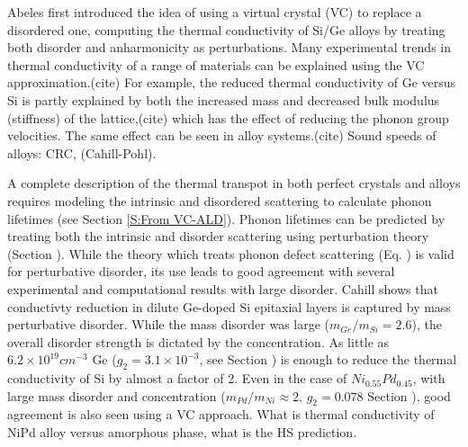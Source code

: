 \documentclass[aps,prb,onecolumn,preprint,superscriptaddress,amsmath,amssymb,floatfix]{revtex4}
\begin{document}
Abeles first introduced the idea of using a virtual crystal (VC) to 
replace a disordered one, computing the
thermal conductivity of Si/Ge alloys by treating both
disorder and anharmonicity as perturbations.\cite{abeles_lattice_1963} 
Many experimental trends in thermal conductivity 
of a range of materials 
can be explained using the VC approximation.(cite) For example,
the reduced thermal conductivity of Ge versus Si is partly explained 
by both the increased mass and decreased bulk modulus (stiffness) of the 
lattice,(cite) which has the effect of reducing the phonon group 
velocities. The same effect can be seen in alloy systems.(cite)
Sound speeds of alloys: CRC, (Cahill-Pohl).

A complete 
description of the thermal transpot in both perfect crystals and alloys 
requires modeling the intrinsic 
and disordered scattering to calculate phonon lifetimes 
(see Section \ref{S:From VC-ALD}).
Phonon lifetimes can be predicted by treating both the intrinsic 
and disorder scattering using perturbation theory (Section ). 
While the theory which treats phonon defect scattering (Eq. ) 
is valid for
perturbative disorder, its use leads to good agreement with
several experimental and computational results with large disorder.  
Cahill shows that conductivty reduction in dilute 
Ge-doped Si epitaxial layers 
is captured by mass perturbative disorder.
\cite{cahill_thermal_2004,cahill_thermal_2005} 
While the mass disorder was large ($m_{Ge}/m_{Si} = 2.6$),  
the overall disorder strength is dictated by the concentration. 
As little as $6.2\times10^{19} cm^{-3}$ Ge
($g_2 = 3.1\times10^{-3}$, see Section ) 
is enough to reduce the thermal conductivity of 
Si by almost a factor of 2.\cite{cahill_thermal_2004}
Even in the
case of $Ni_{0.55}Pd_{0.45}$, with large mass disorder and 
concentration ($m_{Pd}/m_{Ni} \approx 2$, $g_2=0.078$ Section ), 
good agreement is also seen using a VC approach.
\cite{kamitakahara_vibrations_1974} What is thermal conductivity 
of NiPd alloy versus amorphous phase, what is the HS prediction.
\end{document}
